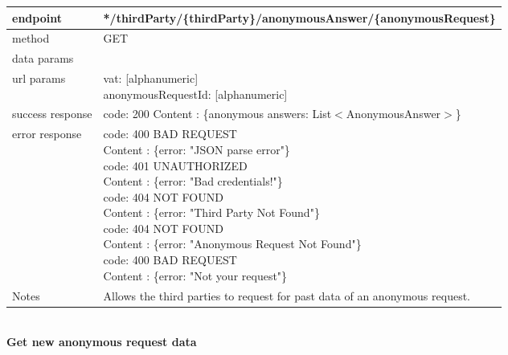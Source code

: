 \begin{legal}
\begin{legal}
\begin{itemize}
								\begin{tabularx}{\linewidth}{| l| l }
									\hline
									endpoint & */thirdParty/\{thirdParty\}/anonymousAnswer/\{anonymousRequest\} \\
									\hline
									method & GET \\
									\hline
									data params & \\
									\hline
									url params &
									\parbox{0.7\textwidth}{
										\bigskip
										vat: [alphanumeric]\\
										anonymousRequestId: [alphanumeric]
										\bigskip
									} \\
									\hline
									success response &
									\parbox{0.7\textwidth}{
										\bigskip
										code: 200\\
										Content : \{anonymous answers: List$<$AnonymousAnswer$>$\}
										\bigskip
									} \\
									\hline
									error response &
									\parbox{0.7\textwidth}{
										\bigskip
										code: 400 BAD REQUEST \\
										Content : \{error: "JSON parse error"\}\\
										code: 401 UNAUTHORIZED \\
										Content : \{error: "Bad credentials!"\}\\
										code: 404 NOT FOUND \\
										Content : \{error: "Third Party Not Found"\}\\
										code: 404 NOT FOUND \\
										Content : \{error: "Anonymous Request Not Found"\}\\
										code: 400 BAD REQUEST \\
										Content : \{error: "Not your request"\}\\
										\bigskip
									} \\
									\hline
									Notes & 
									\parbox{0.7\textwidth}{
										\bigskip Allows the third parties to request for past data of an anonymous request.
									\bigskip}  \\
									\hline
								\end{tabularx}\\
								
								\textbf{Get new anonymous request data} \\
			

\end{itemize}
\end{legal}
\end{legal}
